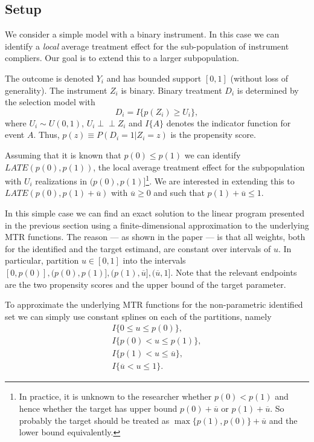 \documentclass[11pt,a4paper,english]{article} %
\newcommand{\indep}{\perp\!\!\!\!\perp}
\numberwithin{equation}{section}
\numberwithin{figure}{section}
\numberwithin{table}{section}
\theoremstyle{definition}
\theoremstyle{remark}
\begin{document}
\subsection{Setup}
We consider a simple model with a binary instrument.
In this case we can identify a \textit{local} average treatment effect for the sub-population of instrument compliers.
Our goal is to extend this to a larger subpopulation.

The outcome is denoted $Y_i$ and has bounded support $[0,1]$ (without loss of generality).
The instrument $Z_i$ is binary.
Binary treatment $D_i$ is determined by the selection model with
\begin{equation}
	D_i = I\{p(Z_i) \geq U_i\},
\end{equation}
where $U_i\sim U(0,1)$, $U_i \indep Z_i$ and $I\{A\}$ denotes the indicator function for event $A$.
Thus, $p(z) \equiv P(D_i = 1 | Z_i = z)$ is the propensity score.

Assuming that it is known that $p(0) \leq p(1)$ we can identify $LATE(p(0), p(1))$, the local average treatment effect for the subpopulation with $U_i$ realizations in $(p(0), p(1)]$\footnote{In practice, it is unknown to the researcher whether $p(0) < p(1)$ and hence whether the target has upper bound $p(0) + \overline{u}$ or $p(1) + \overline{u}$. So probably the target should be treated as $\max\{p(1), p(0)\} + \overline{u}$ and the lower bound equivalently.}.
We are interested in extending this to $LATE(p(0), p(1) + \overline{u})$ with $\overline{u} \geq 0$ and such that $p(1) + \overline{u} \leq 1$.

In this simple case we can find an exact solution to the linear program presented in the previous section using a finite-dimensional approximation to the underlying MTR functions.
The reason --- as shown in the paper --- is that all weights, both for the identified and the target estimand, are constant over intervals of $u$.
In particular, partition $u\in[0,1]$ into the intervals $[0, p(0)], (p(0), p(1)], (p(1), \overline{u}], (\overline{u}, 1]$. Note that the relevant endpoints are the two propensity scores and the upper bound of the target parameter.

To approximate the underlying MTR functions for the non-parametric identified set we can simply use constant splines on each of the partitions, namely
\begin{align}
	I\{0 \leq u \leq p(0)\}, \\
	I\{p(0) < u \leq p(1)\}, \\
	I\{p(1) < u \leq \overline{u}\}, \\
	I\{\overline{u} < u \leq 1\}.
\end{align}
\end{document}
